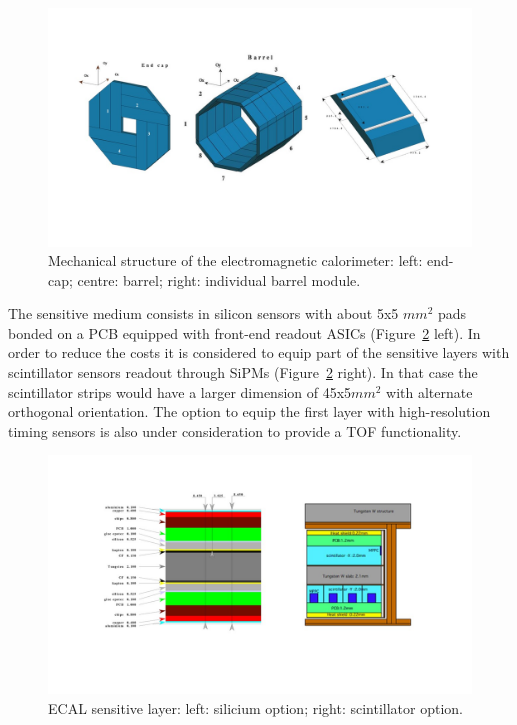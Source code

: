 \begin{figure}[t!]
\centering
\includegraphics[width=1.2\hsize]{Detector/fig/ECAL_structure.jpg}
\caption{Mechanical structure of the electromagnetic calorimeter: left: end-cap; centre: barrel; right: individual barrel module.}
\label{fig:det:ECAL}
\end{figure}

The sensitive medium consists in silicon sensors with about 5x5 $mm^2$ pads bonded on a PCB equipped with front-end readout ASICs (Figure~\ref{fig:det:ECAL_readout} left). In order to reduce the costs it is considered to equip part of the sensitive layers with scintillator sensors readout through SiPMs (Figure~\ref{fig:det:ECAL_readout} right). In that case the scintillator strips would have a larger dimension of 45x5$mm^2$ with alternate orthogonal orientation. The option to equip the first layer with high-resolution timing sensors is also under consideration to provide a TOF functionality.

\begin{figure}[t!]
\centering
\includegraphics[width=1.0\hsize]{Detector/fig/ECAL_readout.jpg}
\caption{ECAL sensitive layer: left: silicium option; right: scintillator option.}
\label{fig:det:ECAL_readout}
\end{figure}


